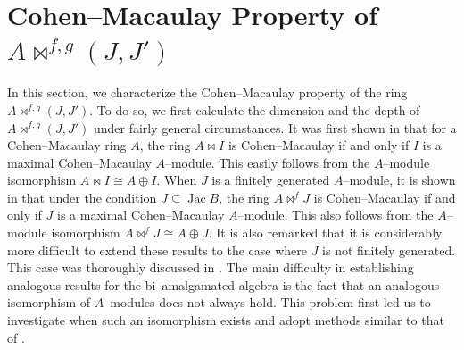 \documentclass{amsart}%
\theoremstyle{plain}
\numberwithin{equation}{section}
\theoremstyle{definition}
\DeclareMathOperator{\jac}{Jac}
\begin{document}
\section{Cohen--Macaulay Property of $A\bowtie^{f,g}(J,J')$}

In this section, we characterize the Cohen--Macaulay property of the ring $A\bowtie^{f,g}(J,J')$. To do so, we first calculate the dimension and the depth of $A\bowtie^{f,g}(J,J')$ under fairly general circumstances. It was first shown in \cite{Gorenstein} that for a Cohen--Macaulay ring $A$, the ring $A\bowtie I$ is Cohen--Macaulay if and only if $I$ is a maximal Cohen--Macaulay $A$--module. This easily follows from the $A$--module isomorphism $A\bowtie I\cong A\oplus I$. When $J$ is a finitely generated $A$--module, it is shown in \cite{DFF3} that under the condition $J\subseteq\jac B$, the ring $A\bowtie^{f}J$ is Cohen--Macaulay if and only if $J$ is a maximal Cohen--Macaulay $A$--module. This also follows from the $A$--module isomorphism $A\bowtie^{f}J\cong A\oplus J$. It is also remarked that it is considerably more difficult to extend these results to the case where $J$ is not finitely generated. This case was thoroughly discussed in \cite{iranlilar}. The main difficulty in establishing analogous results for the bi--amalgamated algebra is the fact that an analogous isomorphism of $A$--modules does not always hold. This problem first led us to investigate when such an isomorphism exists and adopt methods similar to that of \cite{iranlilar}.\medskip
\end{document}
